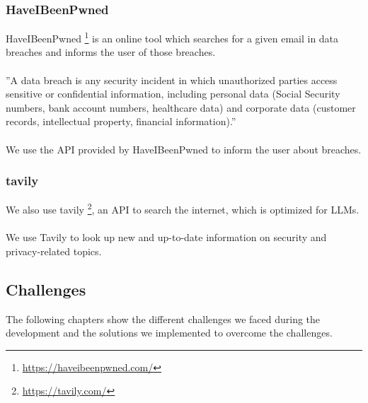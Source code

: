 \documentclass[
    a4paper,
    pagesize,
	pdftex,
    12pt,
]{scrartcl}
\begin{document}
\subsubsection{HaveIBeenPwned}
HaveIBeenPwned \footnote{\url{https://haveibeenpwned.com/}} is an online tool which searches for a given email in data breaches and informs the user of those breaches.
\\ \\
''A data breach is any security incident in which unauthorized parties access sensitive or confidential information, including personal data (Social Security numbers, bank account numbers, healthcare data) and corporate data (customer records, intellectual property, financial information).''\cite{what-is-data-breach}
\\ \\
We use the API provided by HaveIBeenPwned to inform the user about breaches.

\subsubsection{tavily}
We also use tavily \footnote{\url{https://tavily.com/}}, an API to search the internet, which is optimized for LLMs.
\\ \\
We use Tavily to look up new and up-to-date information on security and privacy-related topics.

\subsection{Challenges}
The following chapters show the different challenges we faced during the development and the solutions we implemented to overcome the challenges.
\end{document}
